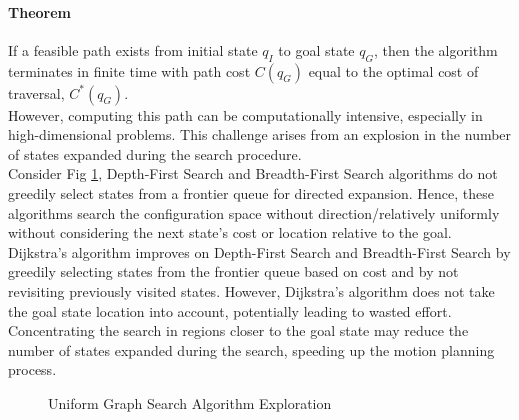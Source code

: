 \documentclass[twoside]{article}
\begin{document}
\paragraph{Theorem} If a feasible path exists from initial state $q_I$ to goal state $q_G$, then the algorithm terminates in finite time with path cost $C(q_G)$ equal to the optimal cost of traversal, $C^*(q_G)$.\\

However, computing this path can be computationally intensive, especially in high-dimensional problems. This challenge arises from an explosion in the number of states expanded during the search procedure. \\

Consider Fig \ref{fig:graph_search}, Depth-First Search and Breadth-First Search algorithms do not greedily select states from a frontier queue for directed expansion. Hence, these algorithms search the configuration space without direction/relatively uniformly without considering the next state's cost or location relative to the goal. Dijkstra's algorithm improves on Depth-First Search and Breadth-First Search by greedily selecting states from the frontier queue based on cost and by not revisiting previously visited states. However, Dijkstra's algorithm does not take the goal state location into account, potentially leading to wasted effort. Concentrating the search in regions closer to the goal state may reduce the number of states expanded during the search, speeding up the motion planning process.

\begin{figure}[h]
\begin{center}
\caption{Uniform Graph Search Algorithm Exploration}
\label{fig:graph_search}
\end{center}
\end{figure}
\end{document}
